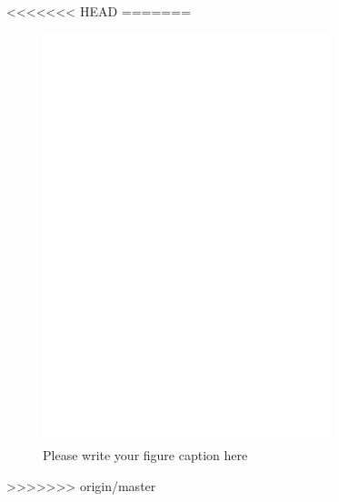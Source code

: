 <<<<<<< HEAD
=======
\begin{figure}
  \includegraphics[width=0.75\textwidth]{bfeed_mob}
\caption{Please write your figure caption here}
\label{fig:1}       %
\end{figure}
>>>>>>> origin/master

